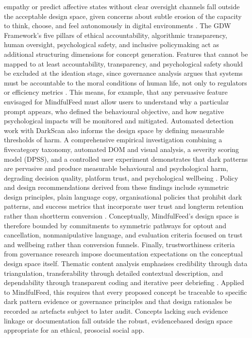\documentclass{article}
\begin{document}
empathy or predict affective states without clear oversight channels fall outside the acceptable design space, given concerns about subtle erosion of the capacity to think, choose, and feel autonomously in digital environments \parencites[3]{7808872}. The GDW Framework's five pillars of ethical accountability, algorithmic transparency, human oversight, psychological safety, and inclusive policymaking act as additional structuring dimensions for concept generation. Features that cannot be mapped to at least accountability, transparency, and psychological safety should be excluded at the ideation stage, since governance analysis argues that systems must be accountable to the moral conditions of human life, not only to regulators or efficiency metrics \parencites[4]{7808872}. This means, for example, that any persuasive feature envisaged for MindfulFeed must allow users to understand why a particular prompt appears, who defined the behavioural objective, and how negative psychological impacts will be monitored and mitigated. Automated detection work with DarkScan also informs the design space by defining measurable thresholds of harm. A comprehensive empirical investigation combining a five\-category taxonomy, automated DOM and visual analysis, a severity scoring model (DPSS), and a controlled user experiment demonstrates that dark patterns are pervasive and produce measurable behavioural and psychological harm, degrading decision quality, platform trust, and psychological wellbeing \parencites[2]{4807303}. Policy and design recommendations derived from these findings include symmetric design principles, plain language copy, organisational policies that prohibit dark patterns, and success metrics that incorporate user trust and long\-term retention rather than short\-term conversion \parencites[8]{4807303}. Conceptually, MindfulFeed's design space is therefore bounded by commitments to symmetric pathways for opt\-out and cancellation, non\-manipulative language, and evaluation criteria focused on trust and wellbeing rather than conversion funnels. Finally, trustworthiness criteria from governance research impose documentation expectations on the conceptual design space itself. Thematic content analysis emphasises credibility through data triangulation, transferability through detailed contextual description, and dependability through transparent coding and iterative peer debriefing \parencites[8]{7808872}. Applied to MindfulFeed, this requires that every proposed concept be traceable to specific dark pattern evidence or governance principles and that design rationales be recorded as artefacts subject to later audit. Concepts lacking such evidence linkage or documentation fall outside the robust, evidence\-based design space appropriate for an ethical, pro\-social social app.
\end{document}
